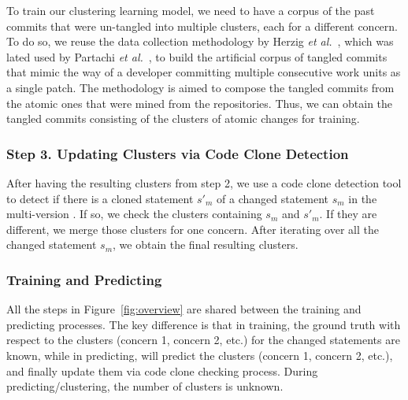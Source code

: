  To train our clustering learning
model, we need to have a corpus of the past commits that were
un-tangled into multiple clusters, each for a different concern. To do
so, we reuse the data collection methodology by Herzig {\em et
  al.}~\cite{kim-emse16}, which was lated used by Partachi {\em et
  al.}~\cite{flexeme-fse20}, to build the artificial corpus of tangled
commits that mimic the way of a developer committing multiple
consecutive work units as a single patch. The methodology is aimed to
compose the tangled commits from the atomic ones that were mined from
the repositories. Thus, we can obtain the tangled commits consisting
of the clusters of atomic changes for training.




\subsubsection{{\bf Step 3. Updating Clusters via Code Clone Detection}}

After having the resulting clusters from step 2, we use a code clone
detection tool to detect if there is a cloned statement $s'_m$ of a
changed statement $s_m$ in the multi-version {\mvpdg}. If so, we check
the clusters containing $s_m$ and $s'_m$. If they are different,
we merge those clusters for one concern. After iterating over
all the changed statement $s_m$, we obtain the final resulting clusters.


\subsubsection*{Training and Predicting}
All the steps in Figure~\ref{fig:overview} are shared between the
training and predicting processes. The key difference is that in
training, the ground truth with respect to the clusters (concern 1,
concern 2, etc.) for the changed statements are known, while in
predicting, {\tool} will predict the clusters (concern 1, concern 2,
etc.), and finally update them via code clone checking process. During
predicting/clustering, the number of clusters is unknown.

